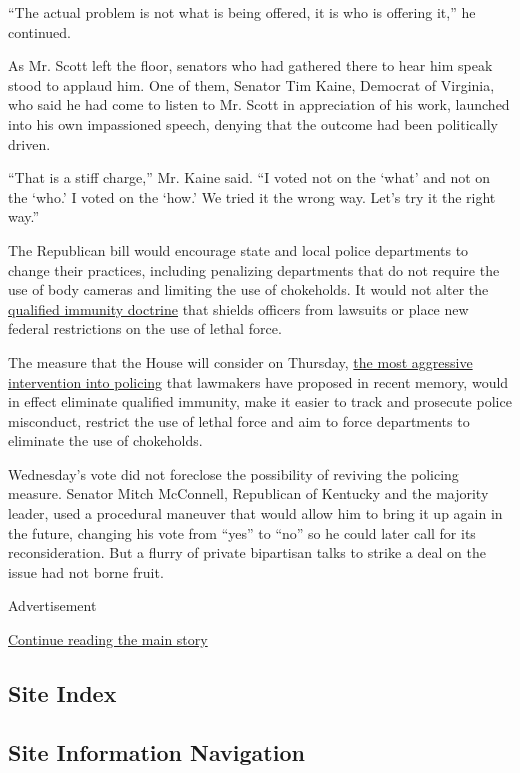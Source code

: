``The actual problem is not what is being offered, it is who is offering
it,'' he continued.

As Mr. Scott left the floor, senators who had gathered there to hear him
speak stood to applaud him. One of them, Senator Tim Kaine, Democrat of
Virginia, who said he had come to listen to Mr. Scott in appreciation of
his work, launched into his own impassioned speech, denying that the
outcome had been politically driven.

``That is a stiff charge,'' Mr. Kaine said. ``I voted not on the `what'
and not on the `who.' I voted on the `how.' We tried it the wrong way.
Let's try it the right way.''

The Republican bill would encourage state and local police departments
to change their practices, including penalizing departments that do not
require the use of body cameras and limiting the use of chokeholds. It
would not alter the
\href{https://www.nytimes.com/2020/06/23/us/politics/qualified-immunity.html}{qualified
immunity doctrine} that shields officers from lawsuits or place new
federal restrictions on the use of lethal force.

The measure that the House will consider on Thursday,
\href{https://www.nytimes.com/2020/06/08/us/politics/democrats-police-misconduct-bill-protests.html}{the
most aggressive intervention into policing} that lawmakers have proposed
in recent memory, would in effect eliminate qualified immunity, make it
easier to track and prosecute police misconduct, restrict the use of
lethal force and aim to force departments to eliminate the use of
chokeholds.

Wednesday's vote did not foreclose the possibility of reviving the
policing measure. Senator Mitch McConnell, Republican of Kentucky and
the majority leader, used a procedural maneuver that would allow him to
bring it up again in the future, changing his vote from ``yes'' to
``no'' so he could later call for its reconsideration. But a flurry of
private bipartisan talks to strike a deal on the issue had not borne
fruit.

Advertisement

\protect\hyperlink{after-bottom}{Continue reading the main story}

\hypertarget{site-index}{%
\subsection{Site Index}\label{site-index}}

\hypertarget{site-information-navigation}{%
\subsection{Site Information
Navigation}\label{site-information-navigation}}

